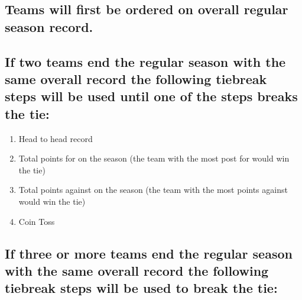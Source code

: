 \documentclass[
]{book}
\providecommand{\tightlist}{%
  \setlength{\itemsep}{0pt}\setlength{\parskip}{0pt}}
\begin{document}
\hypertarget{teams-will-first-be-ordered-on-overall-regular-season-record.}{%
\subsection{Teams will first be ordered on overall regular season record.}\label{teams-will-first-be-ordered-on-overall-regular-season-record.}}

\hypertarget{if-two-teams-end-the-regular-season-with-the-same-overall-record-the-following-tiebreak-steps-will-be-used-until-one-of-the-steps-breaks-the-tie}{%
\subsection{If two teams end the regular season with the same overall record the following tiebreak steps will be used until one of the steps breaks the tie:}\label{if-two-teams-end-the-regular-season-with-the-same-overall-record-the-following-tiebreak-steps-will-be-used-until-one-of-the-steps-breaks-the-tie}}

\begin{enumerate}
\def\labelenumi{\arabic{enumi}.}
\tightlist
\item
  Head to head record
\item
  Total points for on the season (the team with the most post for would win the tie)
\item
  Total points against on the season (the team with the most points against would win the tie)
\item
  Coin Toss
\end{enumerate}

\hypertarget{if-three-or-more-teams-end-the-regular-season-with-the-same-overall-record-the-following-tiebreak-steps-will-be-used-to-break-the-tie}{%
\subsection{If three or more teams end the regular season with the same overall record the following tiebreak steps will be used to break the tie:}\label{if-three-or-more-teams-end-the-regular-season-with-the-same-overall-record-the-following-tiebreak-steps-will-be-used-to-break-the-tie}}
\end{document}
